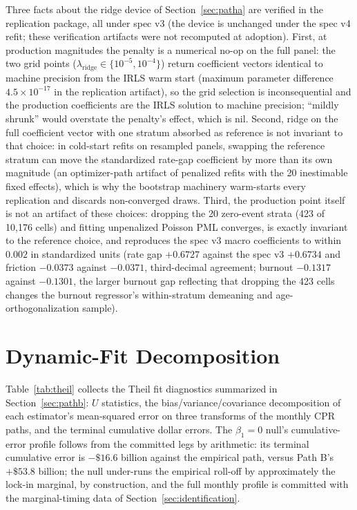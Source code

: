 \documentclass[12pt]{article}
\begin{document}
Three facts about the ridge device of Section~\ref{sec:patha} are verified in the replication package, all under spec v3 (the device is unchanged under the spec v4 refit; these verification artifacts were not recomputed at adoption). First, at production magnitudes the penalty is a numerical no-op on the full panel: the two grid points ($\lambda_{\mathrm{ridge}} \in \{10^{-5}, 10^{-4}\}$) return coefficient vectors identical to machine precision from the IRLS warm start (maximum parameter difference $4.5\times10^{-17}$ in the replication artifact), so the grid selection is inconsequential and the production coefficients are the IRLS solution to machine precision; ``mildly shrunk'' would overstate the penalty's effect, which is nil. Second, ridge on the full coefficient vector with one stratum absorbed as reference is not invariant to that choice: in cold-start refits on resampled panels, swapping the reference stratum can move the standardized rate-gap coefficient by more than its own magnitude (an optimizer-path artifact of penalized refits with the 20 inestimable fixed effects), which is why the bootstrap machinery warm-starts every replication and discards non-converged draws. Third, the production point itself is not an artifact of these choices: dropping the 20 zero-event strata (423 of 10,176 cells) and fitting unpenalized Poisson PML converges, is exactly invariant to the reference choice, and reproduces the spec v3 macro coefficients to within $0.002$ in standardized units (rate gap $+0.6727$ against the spec v3 $+0.6734$ and friction $-0.0373$ against $-0.0371$, third-decimal agreement; burnout $-0.1317$ against $-0.1301$, the larger burnout gap reflecting that dropping the 423 cells changes the burnout regressor's within-stratum demeaning and age-orthogonalization sample).

\section{Dynamic-Fit Decomposition}\label{app:theil}

Table~\ref{tab:theil} collects the Theil fit diagnostics summarized in Section~\ref{sec:pathb}: $U$ statistics, the bias/variance/covariance decomposition of each estimator's mean-squared error on three transforms of the monthly CPR paths, and the terminal cumulative dollar errors. The $\beta_1 = 0$ null's cumulative-error profile follows from the committed legs by arithmetic: its terminal cumulative error is $-\$16.6$ billion against the empirical path, versus Path B's $+\$53.8$ billion; the null under-runs the empirical roll-off by approximately the lock-in marginal, by construction, and the full monthly profile is committed with the marginal-timing data of Section~\ref{sec:identification}.
\end{document}
